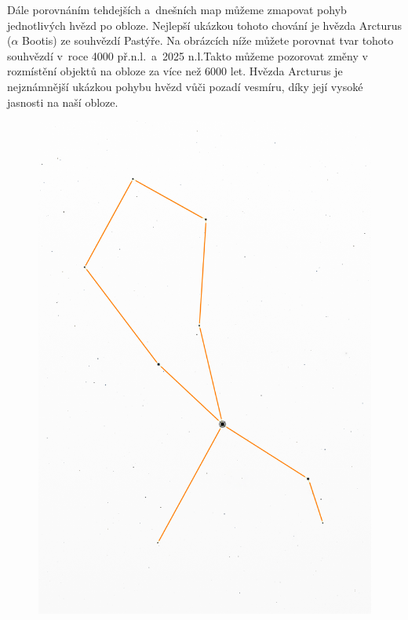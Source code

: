 \documentclass[12pt,a4paper,titlepage]{article}
\begin{document}
Dále porovnáním tehdejších a~dnešních map můžeme zmapovat pohyb jednotlivých hvězd po obloze. Nejlepší ukázkou tohoto chování je hvězda Arcturus ($\alpha$ Bootis) ze souhvězdí Pastýře. Na obrázcích níže můžete porovnat tvar tohoto souhvězdí v~roce 4000 př.n.l.\ a~2025 n.l.\@ Takto můžeme pozorovat změny v rozmístění objektů na obloze za více než 6000 let. Hvězda Arcturus je nejznámnější ukázkou pohybu hvězd vůči pozadí vesmíru, díky její vysoké jasnosti na naší obloze.

\begin{figure}[H]
	\centering
	\begin{minipage}{.45\textwidth}
	  \centering
	  \includegraphics[width=1\linewidth]{-4000.png}
	  ~\label{fig:test1}
	\end{minipage}%

\end{figure}
\end{document}
